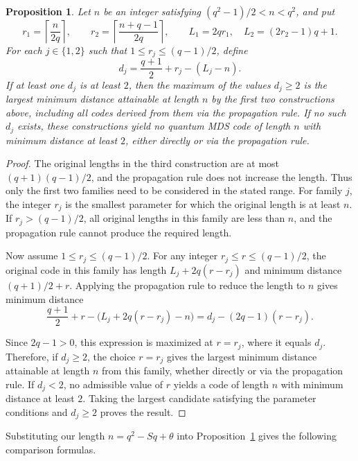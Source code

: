 \documentclass[preprint,12pt,a4paper]{elsarticle}
\newtheorem{proposition}[theorem]{Proposition}
\begin{document}
\begin{proposition}\label{prop:llj}
Let $n$ be an integer satisfying $(q^2-1)/2<n<q^2$, and put
\[
 r_1=\left\lceil\frac n{2q}\right\rceil,
 \qquad r_2=\left\lceil\frac{n+q-1}{2q}\right\rceil,
 \qquad L_1=2qr_1,\quad L_2=(2r_2-1)q+1.
\]
For each $j\in\{1,2\}$ such that $1\le r_j\le(q-1)/2$, define
\[
 d_j=\frac{q+1}{2}+r_j-(L_j-n).
\]
If at least one $d_j$ is at least $2$, then the maximum of the values $d_j\ge2$ is the largest minimum distance attainable at length $n$ by the first two constructions above, including all codes derived from them via the propagation rule. If no such $d_j$ exists, these constructions yield no quantum MDS code of length $n$ with minimum distance at least $2$, either directly or via the propagation rule.
\end{proposition}

\begin{proof}
The original lengths in the third construction are at most $(q+1)(q-1)/2$, and the propagation rule does not increase the length. Thus only the first two families need to be considered in the stated range. For family $j$, the integer $r_j$ is the smallest parameter for which the original length is at least $n$. If $r_j>(q-1)/2$, all original lengths in this family are less than $n$, and the propagation rule cannot produce the required length.

Now assume $1\le r_j\le(q-1)/2$. For any integer $r_j\le r\le(q-1)/2$, the original code in this family has length $L_j+2q(r-r_j)$ and minimum distance $(q+1)/2+r$. Applying the propagation rule to reduce the length to $n$ gives minimum distance
\[
 \frac{q+1}{2}+r-\bigl(L_j+2q(r-r_j)-n\bigr)
 =d_j-(2q-1)(r-r_j).
\]

Since $2q-1>0$, this expression is maximized at $r=r_j$, where it equals $d_j$. Therefore, if $d_j\ge2$, the choice $r=r_j$ gives the largest minimum distance attainable at length $n$ from this family, whether directly or via the propagation rule. If $d_j<2$, no admissible value of $r$ yields a code of length $n$ with minimum distance at least $2$. Taking the largest candidate satisfying the parameter conditions and $d_j\ge2$ proves the result.
\end{proof}

Substituting our length $n=q^2-Sq+\theta$ into Proposition~\ref{prop:llj} gives the following comparison formulas.
\end{document}
